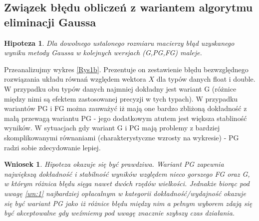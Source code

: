 \documentclass[10pt]{article}
\newtheorem{hip}{Hipoteza}
\newtheorem{wn}{Wniosek}
\begin{document}
\subsection{Związek błędu obliczeń z wariantem algorytmu eliminacji Gaussa}
\begin{hip}
	Dla dowolnego ustalonego rozmiaru macierzy błąd uzyskanego wyniku metody Gaussa w kolejnych wersjach (G,PG,FG) maleje.\label{hip:2}
\end{hip}
Przeanalizujmy wykres \ref{Rys1b}. Prezentuje on zestawienie błędu bezwzględnego rozwiązania układu równań względem wektora $X$ dla typów danych float i double. W przypadku obu typów danych najmniej dokładny jest wariant G (różnice między nimi są efektem zastosowanej precyzji w tych typach). W przypadku wariantów PG i FG można zauważyć iż mają one bardzo zbliżoną dokładność z małą przewagą wariantu PG - jego dodatkowym atutem jest większa stabliność wyników. W sytuacjach gdy wariant G i PG mają problemy z bardziej skomplikowanymi równaniami (charakterystyczne wzrosty na wykresie) - PG radzi sobie zdecydowanie lepiej.
\begin{wn}
	Hipoteza okazuje się być prawdziwa. Wariant PG zapewnia największą dokładność i stabilność wyników względem nieco gorszego FG oraz G, w którym różnica błędu sięga nawet dwóch rzędów wielkości. Jednakże biorąc pod uwagę \ref{wn:1} najbardziej opłacalnym w kategorii dokładność/wydajność okazuje się być wariant PG jako iż różnice błędu między nim a pełnym wyborem zdają się być akceptowalne gdy weźmiemy pod uwagę znacznie szybszy czas działania.\label{wn:2}
\end{wn}
\end{document}
